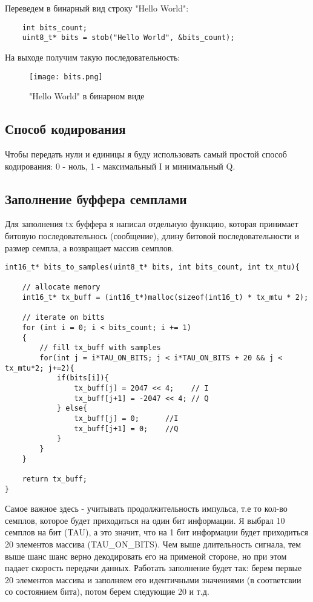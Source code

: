 Переведем в бинарный вид строку "Hello World":

\begin{lstlisting}
    int bits_count;
    uint8_t* bits = stob("Hello World", &bits_count);
\end{lstlisting}

На выходе получим такую последовательность:

\begin{figure}[H]
    \centering
    \texttt{[image: bits.png]}
    \caption{"Hello World" в бинарном виде}
\end{figure}

\subsection*{\textbf{Способ кодирования}}

Чтобы передать нули и единицы я буду использовать самый простой способ кодирования: 0 - ноль, 1 - максимальный I и минимальный Q.

\subsection*{\textbf{Заполнение буффера семплами}}

Для заполнения tx буффера я написал отдельную функцию, которая принимает битовую последовательнось (сообщение), длину битовой последовательности и размер семпла, а возвращает
массив семплов.

\begin{lstlisting}
int16_t* bits_to_samples(uint8_t* bits, int bits_count, int tx_mtu){

    // allocate memory
    int16_t* tx_buff = (int16_t*)malloc(sizeof(int16_t) * tx_mtu * 2);

    // iterate on bitts
    for (int i = 0; i < bits_count; i += 1)
    {   
        // fill tx_buff with samples
        for(int j = i*TAU_ON_BITS; j < i*TAU_ON_BITS + 20 && j < tx_mtu*2; j+=2){
            if(bits[i]){
                tx_buff[j] = 2047 << 4;    // I
                tx_buff[j+1] = -2047 << 4; // Q
            } else{
                tx_buff[j] = 0;      //I
                tx_buff[j+1] = 0;    //Q
            }
        }
    }

    return tx_buff;
}
\end{lstlisting}

Самое важное здесь - учитывать продолжительность импульса, т.е то кол-во семплов, которое будет приходиться на один бит информации. Я выбрал 10 семплов на бит (TAU),
а это значит, что на 1 бит информации будет приходиться 20 элементов массива (TAU\_ON\_BITS). Чем выше длительность сигнала, тем выше шанс шанс верно декодировать его
на применой стороне, но при этом падает скорость передачи данных. Работать заполнение будет так: берем первые 20 элементов массива и заполняем его идентичными значениями
(в соответсвии со состоянием бита), потом берем следующие 20 и т.д.


